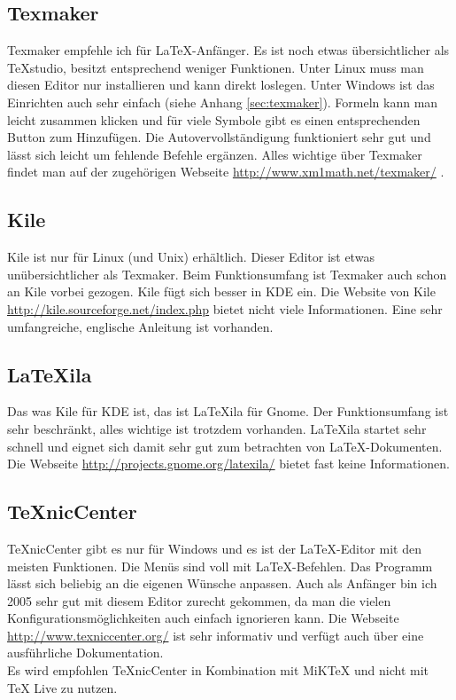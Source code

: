 \subsection{Texmaker}

Texmaker empfehle ich für \LaTeX-Anfänger. Es ist noch etwas übersichtlicher als TeXstudio, besitzt entsprechend weniger Funktionen. Unter Linux muss man diesen Editor nur installieren und kann direkt loslegen. Unter Windows ist das Einrichten auch sehr einfach (siehe Anhang \ref{sec:texmaker}). Formeln kann man leicht zusammen klicken und für viele Symbole gibt es einen entsprechenden Button zum Hinzufügen. Die Autovervollständigung funktioniert sehr gut und lässt sich leicht um fehlende Befehle ergänzen. Alles wichtige über Texmaker findet man auf der zugehörigen Webseite \url{http://www.xm1math.net/texmaker/} .

\subsection{Kile}

Kile ist nur für Linux (und Unix) erhältlich. Dieser Editor ist etwas unübersichtlicher als Texmaker. Beim Funktionsumfang ist Texmaker auch schon an Kile vorbei gezogen. Kile fügt sich besser in KDE ein. Die Website von Kile \url{http://kile.sourceforge.net/index.php} bietet nicht viele Informationen. Eine sehr umfangreiche, englische Anleitung ist vorhanden.

\subsection{LaTeXila}

Das was Kile für KDE ist, das ist LaTeXila für Gnome. Der Funktionsumfang ist sehr beschränkt, alles wichtige ist trotzdem vorhanden. LaTeXila startet sehr schnell und eignet sich damit sehr gut zum betrachten von \LaTeX-Dokumenten. Die Webseite \url{http://projects.gnome.org/latexila/} bietet fast keine Informationen.

\subsection{TeXnicCenter}

TeXnicCenter gibt es nur für Windows und es ist der \LaTeX-Editor mit den meisten Funktionen. Die Menüs sind voll mit \LaTeX-Befehlen. Das Programm lässt sich beliebig an die eigenen Wünsche anpassen. Auch als Anfänger bin ich 2005 sehr gut mit diesem Editor zurecht gekommen, da man die vielen Konfigurationsmöglichkeiten auch einfach ignorieren kann. Die Webseite \url{http://www.texniccenter.org/} ist sehr informativ und verfügt auch über eine ausführliche Dokumentation.\\
Es wird empfohlen TeXnicCenter in Kombination mit MiKTeX und nicht mit TeX Live zu nutzen.

